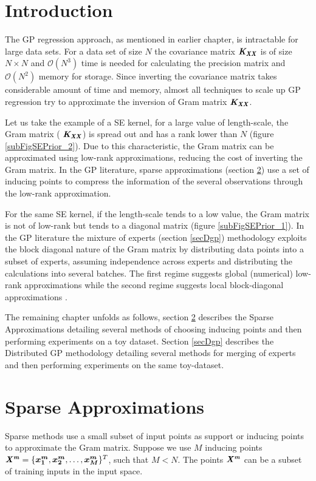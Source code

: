 
\section{Introduction}
The GP regression approach, as mentioned in earlier chapter, is intractable for large data sets. For a data set of size $N$ the covariance matrix $\bm{\mathit{K_{XX}}}$ is of size $N \times N$ and $\mathcal{O}\left ( N^{3} \right )$ time is needed for calculating the precision matrix and $\mathcal{O}\left ( N^{2} \right )$ memory for storage. Since inverting the covariance matrix takes considerable amount of time and memory, almost all techniques to scale up GP regression try to approximate the inversion of Gram matrix $\bm{\mathit{K_{XX}}}$. 

Let us take the example of a SE kernel, for a large value of length-scale, the Gram matrix ( $\bm{\mathit{K_{XX}}}$) is spread out and has a rank lower than  $N$ (figure \ref{subFigSEPrior_2}). Due to this characteristic, the Gram matrix can be approximated using low-rank approximations, reducing the cost of inverting the Gram matrix. In the GP literature, sparse approximations (section \ref{secSparseApprox}) use a set of inducing points to compress the information of the several observations through the low-rank approximation. 

For the same SE kernel, if the length-scale tends to a low value, the Gram matrix is not of low-rank but tends to a diagonal matrix (figure \ref{subFigSEPrior_1}). In the GP literature the mixture of experts (section \ref{secDgp}) methodology exploits the block diagonal nature of the Gram matrix by distributing data points into a subset of experts, assuming independence across experts and distributing the calculations into several batches. The first regime suggests global (numerical) low-rank approximations while the second regime suggests local block-diagonal approximations \cite{march2015askit, chenhan2016inv}. 

The remaining chapter unfolds as follows, section \ref{secSparseApprox} describes the Sparse Approximations detailing several methods of choosing inducing points and then performing experiments on a toy dataset. Section \ref{secDgp} describes the Distributed GP methodology detailing several methods for merging of experts and then performing experiments on the same toy-dataset. 

\section{Sparse Approximations}\label{secSparseApprox}
Sparse methods use a small subset of input points as support or inducing points to approximate the Gram matrix. Suppose we use $M$ inducing points $\bm{\mathit{X^{m}}} = \{\boldsymbol{x^{m}_{1}}, \boldsymbol{x^{m}_{2}}, \ldots, \boldsymbol{x^{m}_{M}}\}^T$, such that $M < N$. The points $\bm{\mathit{X^{m}}}$ can be a subset of training inputs in the input space. 


